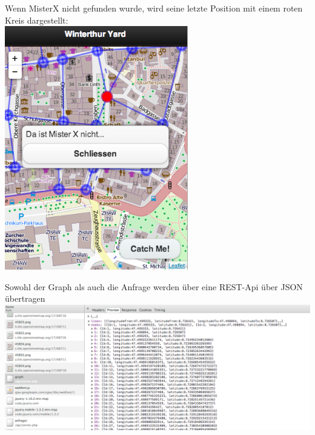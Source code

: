 \documentclass[11pt]{article}
\begin{document}
Wenn MisterX nicht gefunden wurde, wird seine letzte Position mit einem roten Kreis dargestellt:  \\
\includegraphics[width=8cm]{Bilder/notFound.png}

Sowohl der Graph als auch die Anfrage werden über eine REST-Api über JSON übertragen \\
\includegraphics[width=15cm]{Bilder/rest.png}
\end{document}
